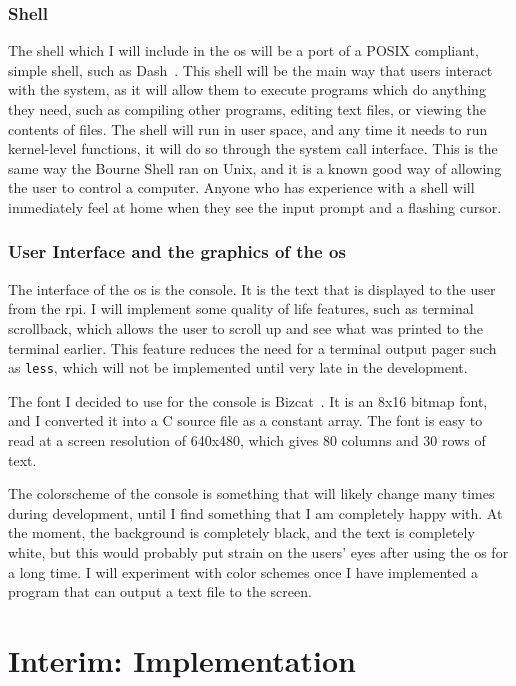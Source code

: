 \documentclass{article}
\begin{document}
\subsubsection{Shell}
The shell which I will include in the \gls{os} will be a port of a POSIX
compliant, simple shell, such as Dash~\cite{dash-shell}. This shell will be the
main way that users interact with the system, as it will allow them to execute
programs which do anything they need, such as compiling other programs, editing
text files, or viewing the contents of files. The shell will run in user space,
and any time it needs to run kernel-level functions, it will do so through the
system call interface. This is the same way the Bourne Shell ran on Unix, and
it is a known good way of allowing the user to control a computer. Anyone who
has experience with a shell will immediately feel at home when they see the
input prompt and a flashing cursor.

\subsubsection{User Interface and the graphics of the
\texorpdfstring{\gls{os}}{OS}}
The interface of the \gls{os} is the console. It is the text that is displayed
to the user from the \gls{rpi}. I will implement some quality of life features,
such as terminal scrollback, which allows the user to scroll up and see what
was printed to the terminal earlier. This feature reduces the need for a
terminal output pager such as \texttt{less}, which will not be implemented
until very late in the development.

The font I decided to use for the console is Bizcat~\cite{bizcat-font}. It is
an 8x16 bitmap font, and I converted it into a C source file as a constant
array. The font is easy to read at a screen resolution of 640x480, which gives
80 columns and 30 rows of text.

The colorscheme of the console is something that will likely change many times
during development, until I find something that I am completely happy with. At
the moment, the background is completely black, and the text is completely
white, but this would probably put strain on the users' eyes after using the
\gls{os} for a long time. I will experiment with color schemes once I have
implemented a program that can output a text file to the screen.

\section{Interim: Implementation}
\end{document}
